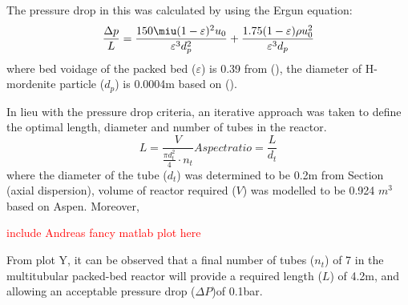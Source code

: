 The pressure drop in this was calculated by using the Ergun equation: 
\begin{equation}
    \frac{\Delta p}{L} = \frac{150 \miu (1- \varepsilon)^2 u_0}{\varepsilon^3 d_p^2} + \frac{1.75(1-\varepsilon)\rho u_0^2}{\varepsilon^3 d_p}
    \label{eqn:ergun}
\end{equation}
where bed voidage of the packed bed ($\varepsilon$) is 0.39 from (), the diameter of H-mordenite particle ($d_p$) is 0.0004m based on (). 

In lieu with the pressure drop criteria, an iterative approach was taken to define the optimal length, diameter and number of tubes in the reactor. 
\begin{equation}
    L= \frac{V}{\frac{\pi d_t^2}{4}\cdot n_t}
    Aspect ratio = \frac{L}{d_t}
    \label{eqn:pressuredrop}
\end{equation}
where the diameter of the tube ($d_t$) was determined to be 0.2m from Section (axial dispersion), volume of reactor required ($V$) was modelled to be 0.924 $m^3$ based on Aspen. Moreover, 

\textcolor{red}{include Andreas fancy matlab plot here}


From plot Y, it can be observed that a final number of tubes ($n_t$) of 7 in the multitubular packed-bed reactor will provide a required length ($L$) of 4.2m, and allowing an acceptable pressure drop ($\Delta P$)of 0.1bar.  